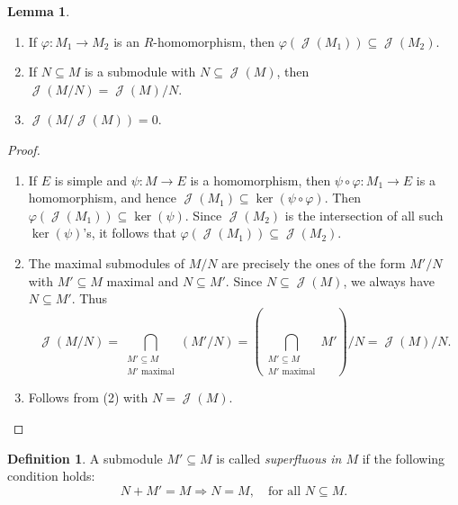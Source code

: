 \documentclass[12pt,a4paper]{report}
\theoremstyle{definition}
\newtheorem{lemma}[theorem]{Lemma}
\newtheorem{defn}[theorem]{Definition}
\theoremstyle{num.custom-title}
\DeclareMathOperator{\J}{\mathcal{J}}
\DeclareMathOperator{\sse}{\subseteq}
\renewcommand{\phi}{\varphi}
\begin{document}
\begin{lemma}\ 
\begin{enumerate}
\item If $\phi : M_1 \to M_2$ is an $R$-homomorphism, then $\phi(\J(M_1)) \sse \J(M_2)$.
\item If $N \sse M$ is a submodule with $N \sse \J(M)$, then $\J(M/N)=\J(M)/N$.
\item $\J(M/\J(M)) = 0$.
\end{enumerate}
\begin{proof}\ 
\begin{enumerate}
\item If $E$ is simple and $\psi : M \to E$ is a homomorphism, then $\psi \circ \phi : M_1 \to E$ is a homomorphism, and hence $\J(M_1) \sse \ker(\psi \circ \phi)$. Then $\phi(\J(M_1)) \sse \ker(\psi)$. Since $\J(M_2)$ is the intersection of all such $\ker(\psi)$'s, it follows that $\phi(\J(M_1)) \sse \J(M_2)$.
\item The maximal submodules of $M/N$ are precisely the ones of the form $M'/N$ with $M' \sse M$ maximal and $N \sse M'$. Since $N \sse \J(M)$, we always have $N \sse M'$. Thus
\[
\J(M/N) = \bigcap_{\substack{M' \sse M \\ M' \text{ maximal}}} (M'/N) = \left( \bigcap_{\substack{M' \sse M \\ M' \text{ maximal}}} M' \right) /N = \J(M)/N. 
\]
\item Follows from (2) with $N=\J(M)$.
\end{enumerate}
\end{proof}
\end{lemma}

\begin{defn}
A submodule $M' \sse M$ is called \emph{superfluous in $M$} if the following condition holds:
\[
N+M' = M \Longrightarrow N=M, \quad \text{for all } N \sse M.
\]
\end{defn}
\end{document}
